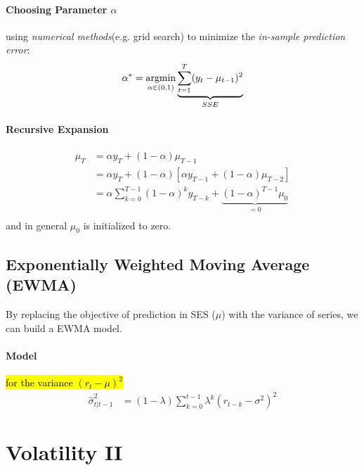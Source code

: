 \documentclass[11pt]{article}
\begin{document}
			\paragraph{Choosing Parameter $\alpha$} using \emph{numerical methods}(e.g. grid search) to minimize the \emph{in-sample prediction error}:
				\begin{gather}
					\alpha^* = \operatorname*{argmin}_{\alpha \in (0, 1)} \underbrace{\sum_{t=1}^T(y_t - \mu_{t-1})^2}_{SSE}
				\end{gather}
			
			\paragraph{Recursive Expansion}
				\begin{align}
					\mu_T &= \alpha y_T + (1 - \alpha) \mu_{T-1} \\
					&= \alpha y_T + (1 - \alpha) [\alpha y_{T-1} + (1 - \alpha) \mu_{T-2}] \\
					&= \alpha \sum_{k=0}^{T-1}(1-\alpha)^k y_{T-k} + \underbrace{(1 - \alpha)^{T-1} \mu_0}_{=0} \\
				\end{align}
				and in general $\mu_0$ is initialized to zero.
		
		\subsection{Exponentially Weighted Moving Average (EWMA)}
			\begin{remark}
				By replacing the objective of prediction in SES ($\mu$) with the variance of series, we can build a EWMA model. 
			\end{remark}
			
			\paragraph{Model} \hl{for the variance $(r_t - \mu)^2$}
				\begin{align}
					\hat{\sigma}^2_{t|t-1} &= (1 - \lambda) \sum_{k=0}^{t-1} \lambda^k (r_{t-k} - \sigma^2)^2 
				\end{align}
				
	
	\section{Volatility II}
\end{document}
